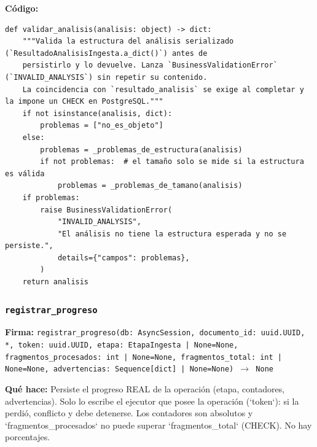 \documentclass[11pt,a4paper]{article}
\begin{document}
\textbf{Código:}
\begin{lstlisting}
def validar_analisis(analisis: object) -> dict:
    """Valida la estructura del análisis serializado (`ResultadoAnalisisIngesta.a_dict()`) antes de
    persistirlo y lo devuelve. Lanza `BusinessValidationError` (`INVALID_ANALYSIS`) sin repetir su contenido.
    La coincidencia con `resultado_analisis` se exige al completar y la impone un CHECK en PostgreSQL."""
    if not isinstance(analisis, dict):
        problemas = ["no_es_objeto"]
    else:
        problemas = _problemas_de_estructura(analisis)
        if not problemas:  # el tamaño solo se mide si la estructura es válida
            problemas = _problemas_de_tamano(analisis)
    if problemas:
        raise BusinessValidationError(
            "INVALID_ANALYSIS",
            "El análisis no tiene la estructura esperada y no se persiste.",
            details={"campos": problemas},
        )
    return analisis
\end{lstlisting}

\subsubsection*{\texttt{registrar\_progreso}}
\textbf{Firma:} \texttt{registrar\_progreso(db: AsyncSession, documento\_id: uuid.UUID, *, token: uuid.UUID, etapa: EtapaIngesta | None=None, fragmentos\_procesados: int | None=None, fragmentos\_total: int | None=None, advertencias: Sequence[dict] | None=None) $\rightarrow$ None}

\textbf{Qué hace:} Persiste el progreso REAL de la operación (etapa, contadores, advertencias). Solo lo escribe el
ejecutor que posee la operación (`token`): si la perdió, conflicto y debe detenerse. Los contadores son
absolutos y `fragmentos\_procesados` no puede superar `fragmentos\_total` (CHECK). No hay porcentajes.
\end{document}
